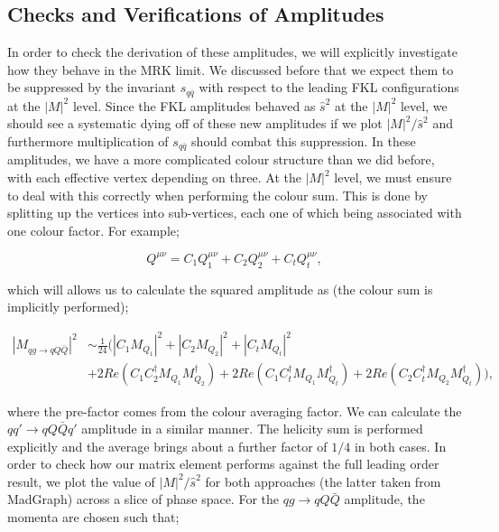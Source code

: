 \subsection{Checks and Verifications of Amplitudes}

In order to check the derivation of these amplitudes, we will explicitly investigate how they behave in the MRK limit. We discussed before that we expect them to be suppressed by the invariant $s_{q\bar{q}}$ with respect to the leading FKL configurations at the $|M|^2$ level. Since the FKL amplitudes behaved as $\hat{s}^2$ at the $|M|^2$ level, we should see a systematic dying off of these new amplitudes if we plot $|M|^2/\hat{s}^2$ and furthermore multiplication of $s_{q \bar{q}}$ should combat this suppression. In these amplitudes, we have a more complicated colour structure than we did before, with each effective vertex depending on three. At the $|M|^2$ level, we must ensure to deal with this correctly when performing the colour sum. This is done by splitting up the vertices into sub-vertices, each one of which being associated with one colour factor. For example;

\begin{equation}
Q^{\mu \nu} = C_1 Q^{\mu \nu}_1 + C_2 Q^{\mu \nu}_2 + C_t Q^{\mu \nu}_t,
\end{equation}

which will allows us to calculate the squared amplitude as (the colour sum is implicitly performed);

\begin{equation}
\begin{split}
|M_{qg \to qQ\bar{Q}}|^2 &\sim \frac{1}{24} \bigg(|C_1 M_{Q_1}|^2 + |C_2 M_{Q_2}|^2 + |C_t M_{Q_t}|^2 \\
&+ 2 Re(C_1 C_2^\dagger M_{Q_1}M^\dagger_{Q_2}) + 2 Re(C_1 C_t^\dagger M_{Q_1}M^\dagger_{Q_t}) + 2 Re(C_2 C_t^\dagger M_{Q_2}M^\dagger_{Q_t}) \bigg),
\end{split}
\end{equation}

where the pre-factor comes from the colour averaging factor. We can calculate the $qq' \to qQ\bar{Q}q'$ amplitude in a similar manner. The helicity sum is performed explicitly and the average brings about a further factor of $1/4$ in both cases. In order to check how our matrix element performs against the full leading order result, we plot the value of $|M|^2/\hat{s}^2$ for both approaches (the latter taken from MadGraph) across a slice of phase space. For the $qg \to qQ\bar{Q}$ amplitude, the momenta are chosen such that;

